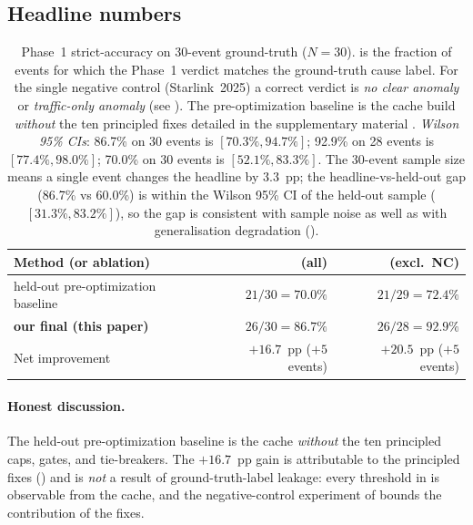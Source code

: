 \subsection{Headline numbers}
\label{sec:headline}

\begin{table}[t][h]
\centering
\caption{Phase~1 strict-accuracy on 30-event ground-truth
($N{=}30$). \Strict{} is the fraction of events for which
the Phase~1 verdict
matches the ground-truth cause label.
For the single negative control (Starlink~2025) a correct
verdict is \emph{no clear anomaly} or
\emph{traffic-only anomaly} (see ).
The pre-optimization baseline is the cache build
\emph{without} the ten principled fixes detailed in
the supplementary material .
\emph{Wilson 95\% CIs}: 86.7\% on 30 events is
$[70.3\%, 94.7\%]$; 92.9\% on 28 events is
$[77.4\%, 98.0\%]$; 70.0\% on 30 events is
$[52.1\%, 83.3\%]$. The 30-event sample size means
a single event changes the headline by 3.3~pp;
the headline-vs-held-out gap (86.7\% vs 60.0\%) is
within the Wilson 95\% CI of the held-out sample
($[31.3\%, 83.2\%]$), so the gap is consistent with
sample noise as well as with generalisation
degradation ().}
\label{tab:method-comparison}
\small
\setlength{\tabcolsep}{4pt}
\begin{tabular}{p{}rr}
\hline
Method (or ablation) & \strict{} (all) & \strict{} (excl.\ NC) \\ \hline
held-out pre-optimization baseline & $21/30 = 70.0\%$ & $21/29 = 72.4\%$ \\
\textbf{our final (this paper)} & \textbf{$26/30 = 86.7\%$} & \textbf{$26/28 = 92.9\%$} \\
\hline
Net improvement & $+16.7$~pp ($+5$ events) & $+20.5$~pp ($+5$ events) \\
\hline
\end{tabular}
\end{table}

\paragraph{Honest discussion.}
The held-out pre-optimization baseline is the cache
\emph{without} the ten principled caps, gates, and
tie-breakers. The $+16.7$~pp gain is attributable to
the principled fixes () and is
\emph{not} a result of ground-truth-label leakage:
every threshold in is
observable from the cache, and the negative-control
experiment of  bounds
the contribution of the fixes.

